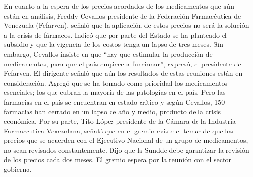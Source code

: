 \documentclass{article}%
\begin{document}
%
En cuanto a la espera de los precios acordados de los medicamentos que aún están en análisis, Freddy Cevallos presidente de la Federación Farmacéutica de Venezuela (Fefarven), señaló que la aplicación de estos precios no será la solución a la crisis de fármacos.%
\newline%
%
Indicó que por parte del Estado se ha planteado el subsidio y que la vigencia de los costos tenga un lapso de tres meses.%
\newline%
%
Sin embargo, Cevallos insiste en que “hay que estimular la producción de medicamentos, para que el país empiece a funcionar”, expresó, el presidente de Fefarven.%
\newline%
%
El dirigente señaló que aún los resultados de estas reuniones están en consideración.%
\newline%
%
Agregó que se ha tomado como prioridad los medicamentos esenciales; los que cubran la mayoría de las patologías en el país.%
\newline%
%
Pero las farmacias en el país se encuentran en estado crítico y según Cevallos, 150 farmacias han cerrado en un lapso de año y medio, producto de la crisis económica.%
\newline%
%
Por su parte, Tito López presidente de la Cámara de la Industria Farmacéutica Venezolana, señaló que en el gremio existe el temor de que los precios que se acuerden con el Ejecutivo Nacional de un grupo de medicamentos, no sean revisados constantemente.%
\newline%
%
Dijo que la Sundde debe garantizar la revisión de los precios cada dos meses.%
\newline%
%
El gremio espera por la reunión con el sector gobierno.%
\newline%
%
\end{document}
